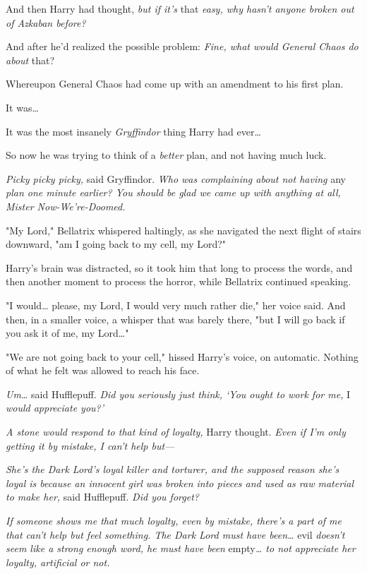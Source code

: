 And then Harry had thought, \emph{but if it's} that \emph{easy, why hasn't 
anyone broken out of Azkaban before?}

And after he'd realized the possible problem: \emph{Fine, what would General 
Chaos do about} that?

Whereupon General Chaos had come up with an amendment to his first plan.

It was{\ldots}

It was the most insanely \emph{Gryffindor} thing Harry had ever{\ldots}

So now he was trying to think of a \emph{better} plan, and not having much luck.

\emph{Picky picky picky,} said Gryffindor. \emph{Who was complaining about not 
having} any \emph{plan one minute earlier? You should be glad we came up with 
anything at all, Mister Now-We're-Doomed.}

"My Lord," Bellatrix whispered haltingly, as she navigated the next flight of 
stairs downward, "am I going back to my cell, my Lord?"

Harry's brain was distracted, so it took him that long to process the words, 
and then another moment to process the horror, while Bellatrix continued 
speaking.

"I would{\ldots} please, my Lord, I would very much rather die," her voice 
said. And then, in a smaller voice, a whisper that was barely there, "but I 
will go back if you ask it of me, my Lord{\ldots}"

"We are not going back to your cell," hissed Harry's voice, on automatic. 
Nothing of what he felt was allowed to reach his face.

\emph{Um{\ldots}} said Hufflepuff. \emph{Did you seriously just think, `You 
ought to work for me,} I \emph{would appreciate you?'}

\emph{A stone would respond to that kind of loyalty,} Harry thought. \emph{Even 
if I'm only getting it by mistake, I can't help but---}

\emph{She's the Dark Lord's loyal killer and torturer, and the supposed reason 
she's loyal is because an innocent girl was broken into pieces and used as raw 
material to make her,} said Hufflepuff. \emph{Did you forget?}

\emph{If someone shows me that much loyalty, even by mistake, there's a part of 
me that can't help but feel something. The Dark Lord must have been{\ldots}} 
evil \emph{doesn't seem like a strong enough word, he must have been} 
empty\emph{{\ldots} to not appreciate her loyalty, artificial or not.}

